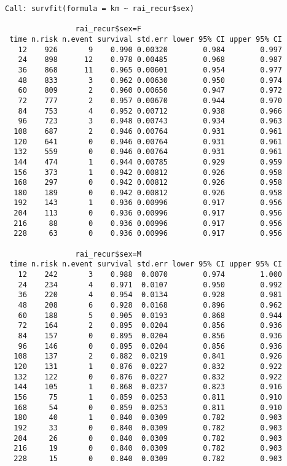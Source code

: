 \documentclass[
  letterpaper,
  DIV=11,
  numbers=noendperiod]{scrartcl}
\begin{document}
\begin{verbatim}
Call: survfit(formula = km ~ rai_recur$sex)

                rai_recur$sex=F 
 time n.risk n.event survival std.err lower 95% CI upper 95% CI
   12    926       9    0.990 0.00320        0.984        0.997
   24    898      12    0.978 0.00485        0.968        0.987
   36    868      11    0.965 0.00601        0.954        0.977
   48    833       3    0.962 0.00630        0.950        0.974
   60    809       2    0.960 0.00650        0.947        0.972
   72    777       2    0.957 0.00670        0.944        0.970
   84    753       4    0.952 0.00712        0.938        0.966
   96    723       3    0.948 0.00743        0.934        0.963
  108    687       2    0.946 0.00764        0.931        0.961
  120    641       0    0.946 0.00764        0.931        0.961
  132    559       0    0.946 0.00764        0.931        0.961
  144    474       1    0.944 0.00785        0.929        0.959
  156    373       1    0.942 0.00812        0.926        0.958
  168    297       0    0.942 0.00812        0.926        0.958
  180    189       0    0.942 0.00812        0.926        0.958
  192    143       1    0.936 0.00996        0.917        0.956
  204    113       0    0.936 0.00996        0.917        0.956
  216     88       0    0.936 0.00996        0.917        0.956
  228     63       0    0.936 0.00996        0.917        0.956

                rai_recur$sex=M 
 time n.risk n.event survival std.err lower 95% CI upper 95% CI
   12    242       3    0.988  0.0070        0.974        1.000
   24    234       4    0.971  0.0107        0.950        0.992
   36    220       4    0.954  0.0134        0.928        0.981
   48    208       6    0.928  0.0168        0.896        0.962
   60    188       5    0.905  0.0193        0.868        0.944
   72    164       2    0.895  0.0204        0.856        0.936
   84    157       0    0.895  0.0204        0.856        0.936
   96    146       0    0.895  0.0204        0.856        0.936
  108    137       2    0.882  0.0219        0.841        0.926
  120    131       1    0.876  0.0227        0.832        0.922
  132    122       0    0.876  0.0227        0.832        0.922
  144    105       1    0.868  0.0237        0.823        0.916
  156     75       1    0.859  0.0253        0.811        0.910
  168     54       0    0.859  0.0253        0.811        0.910
  180     40       1    0.840  0.0309        0.782        0.903
  192     33       0    0.840  0.0309        0.782        0.903
  204     26       0    0.840  0.0309        0.782        0.903
  216     19       0    0.840  0.0309        0.782        0.903
  228     15       0    0.840  0.0309        0.782        0.903
\end{verbatim}
\end{document}
